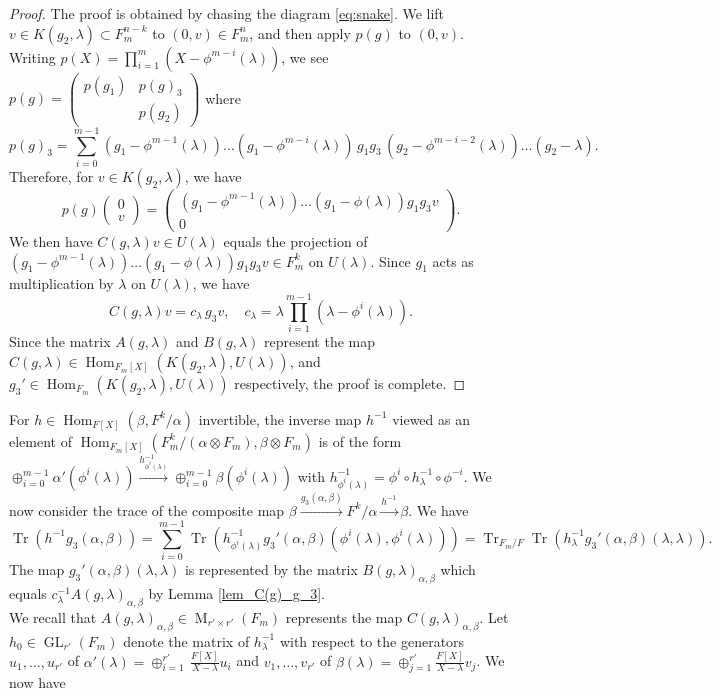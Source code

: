 \documentclass[reqno]{amsart}
\theoremstyle{definition}
\theoremstyle{remark}
\numberwithin{equation}{section}
\DeclareMathOperator{\Hom}{Hom}
\DeclareMathOperator{\GL}{GL}
\DeclareMathOperator{\M}{M}
\DeclareMathOperator{\tr}{Tr}
\newcommand{\bbsm}{\left (\begin{smallmatrix}}      \newcommand{\besm}{\end{smallmatrix}\right )}
\newcommand{\bbm}{\begin{pmatrix}}      \newcommand{\bem}{\end{pmatrix}}
\begin{document}
{\begin{proof} 
 The proof is obtained by chasing the diagram \eqref{eq:snake}.   We lift $v \in K(g_2, \lambda) \subset F_m^{n-k}$ to $(0,v) \in F_m^n$, and then apply $p(g)$ to  $(0,v)$.  Writing $p(X)=\prod_{i=1}^{m} (X-\phi^{m-i}(\lambda))$, we see  $p(g)=\bbsm p(g_1) & p(g)_3 \\ & p(g_2) \besm$ where 
\[ p(g)_3 = \sum_{i=0}^{m-1} 
(g_1-\phi^{m-1}(\lambda)) \dots (g_1-\phi^{m-i}(\lambda)) \, g_1g_3 \, (g_2-\phi^{m-i-2}(\lambda)) \dots (g_2-\lambda).\]
Therefore, for $v \in K(g_2,\lambda)$, we have 
\[p(g) \bbsm 0 \\ v \besm = \bbm  (g_1-\phi^{m-1}(\lambda)) \dots (g_1-\phi(\lambda))g_1g_3 v \\ 0 \bem. \]
We then have $C(g,\lambda) v \in U(\lambda)$ equals the projection of $(g_1-\phi^{m-1}(\lambda)) \dots (g_1-\phi(\lambda))g_1g_3 v \in F_m^k$ on $U(\lambda)$. Since $g_1$ acts as multiplication by $\lambda$ on $U(\lambda)$, we have 
\[ C(g, \lambda) v = c_\lambda \, g_3 v, \quad  c_\lambda = \lambda \prod_{i=1}^{m-1}(\lambda- \phi^i(\lambda)).\]
Since the matrix $A(g, \lambda)$ and $B(g,\lambda)$ represent the map 
$C(g,\lambda) \in \Hom_{F_m[X]}(K(g_2, \lambda), U(\lambda))$, and  
$g_3' \in \Hom_{F_m}(K(g_2,\lambda), U(\lambda))$ respectively, the proof is complete.
 \end{proof}
 For  $h \in \Hom_{F[X]}(\beta, F^k/\alpha)$ invertible, the inverse map $h^{-1}$ viewed as an element of $\Hom_{F_m[X]}( F_m^k/(\alpha \otimes F_m), \beta \otimes F_m)$ is of the form $\oplus_{i=0}^{m-1} \alpha'(\phi^i(\lambda)) \xrightarrow{h^{-1}_{\phi^i(\lambda)}} \oplus_{i=0}^{m-1} \beta(\phi^i(\lambda))$ with 
 $h^{-1}_{\phi^i(\lambda)} = \phi^i \circ h^{-1}_\lambda \circ \phi^{-i}$. We now consider the trace of the composite map $
 \beta \xrightarrow{g_3(\alpha, \beta)}  F^k/\alpha \xrightarrow{h^{-1}} \beta$. We have  
 \[ \tr(h^{-1} g_3(\alpha, \beta))= \sum_{i=0}^{m-1} \tr( h^{-1}_{\phi^i(\lambda)} g_3'(\alpha,\beta)(\phi^i(\lambda),\phi^i(\lambda))) = \tr_{F_m/F} \tr(h^{-1}_\lambda g_3'(\alpha,\beta)(\lambda,\lambda)). \]
 The map $g_3'(\alpha,\beta)(\lambda, \lambda)$ is represented by the matrix 
$B(g,\lambda)_{\alpha, \beta}$ which equals
$c_\lambda^{-1} A(g,\lambda)_{\alpha, \beta}$ by Lemma  \ref{lem_C(g)_g_3}. \\


We recall that $A(g,\lambda)_{\alpha, \beta} \in \M_{r' \times r'}(F_m)$ represents  the map $C(g,\lambda)_{\alpha, \beta}$.
Let $h_0 \in \GL_{r'}(F_m)$ denote the matrix of $h^{-1}_\lambda$ with respect to the generators $u_1, \dots, u_{r'}$ of 
$\alpha'(\lambda)= \oplus_{i=1}^{r'} \, \tfrac{F[X]}{X-\lambda} u_i$ 
and $v_1, \dots, v_{r'}$ of 
$\beta(\lambda) = \oplus_{j=1}^{r'} \tfrac{F[X]}{X-\lambda} v_j$. We now have 

}
\end{document}
